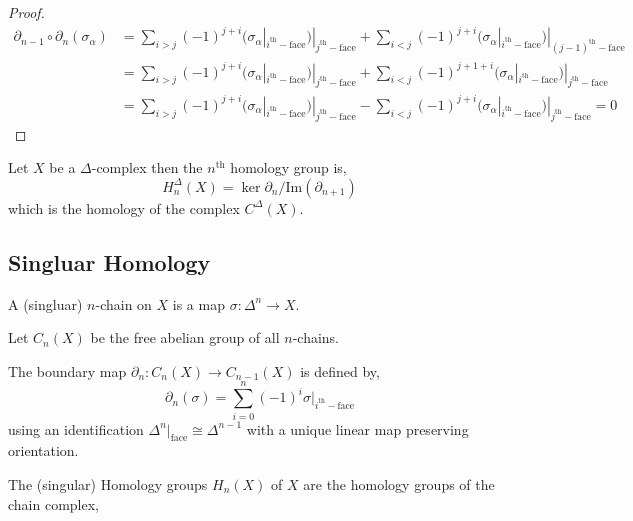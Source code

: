 \documentclass[12pt]{extarticle}
\renewcommand{\Im}[1]{\mathrm{Im}(#1)}
\theoremstyle{definition}
\newenvironment{definition}[1][Definition:]{\begin{trivlist}
\item[\hskip \labelsep {\bfseries #1}]}{\end{trivlist}}
\begin{document}
\begin{proof}
\begin{align*} 
\partial_{n-1} \circ \partial_n(\sigma_\alpha) 
& = \sum_{i > j} (-1)^{j + i} (\sigma_\alpha|_{i^{\mathrm{th}}-\text{face}})|_{j^{\mathrm{th}}-\text{face}} + \sum_{i < j} (-1)^{j + i} (\sigma_\alpha|_{i^{\mathrm{th}}-\text{face}})|_{(j-1)^{\mathrm{th}}-\text{face}}
\\
& = \sum_{i > j} (-1)^{j + i} (\sigma_\alpha|_{i^{\mathrm{th}}-\text{face}})|_{j^{\mathrm{th}}-\text{face}} + \sum_{i < j} (-1)^{j + 1 + i} (\sigma_\alpha|_{i^{\mathrm{th}}-\text{face}})|_{j^{\mathrm{th}}-\text{face}}
\\
& = \sum_{i > j} (-1)^{j + i} (\sigma_\alpha|_{i^{\mathrm{th}}-\text{face}})|_{j^{\mathrm{th}}-\text{face}} - \sum_{i < j} (-1)^{j + i} (\sigma_\alpha|_{i^{\mathrm{th}}-\text{face}})|_{j^{\mathrm{th}}-\text{face}} = 0
\end{align*}
\end{proof}

\begin{definition}
Let $X$ be a $\Delta$-complex then the $n^{\mathrm{th}}$ homology group is,
\[ H^\Delta_n(X) = \ker{\partial_n}/\Im{\partial_{n + 1}} \]
which is the homology of the complex $C^\Delta(X)$. 
\end{definition}


\subsection{Singluar Homology}

\begin{definition}
A (singluar) $n$-chain on $X$ is a map $\sigma : \Delta^n \to X$. 
\end{definition}

\begin{definition}
Let $C_n(X)$ be the free abelian group of all $n$-chains. 
\end{definition}

\begin{definition}
The boundary map $\partial_n : C_n(X) \to C_{n-1}(X)$ is defined by,
\[ \partial_n(\sigma) = \sum_{i = 0}^n (-1)^i \sigma|_{i^{\mathrm{th}}-\text{face}}\]
using an identification $\Delta^n |_{\text{face}} \cong \Delta^{n-1}$ with a unique linear map preserving orientation. 
\end{definition}

\begin{definition}
The (singular) Homology groups $H_n(X)$ of $X$ are the homology groups of the chain complex,
\begin{center}
\end{center}
\end{definition}
\end{document}

